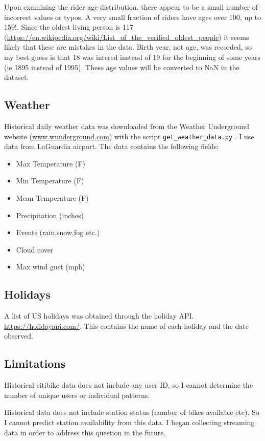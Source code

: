 \documentclass[11pt]{article}
\begin{document}
Upon examining the rider age distribution, there appear to be a small number of incorrect values or typos. A very small fraction of riders have ages over 100, up to 159!. Since the oldest living person is 117 (\url{https://en.wikipedia.org/wiki/List_of_the_verified_oldest_people}) it seems likely that these are mistakes in the data. Birth year, not age, was recorded, so my best guess is that 18 was intered instead of 19 for the beginning of some years (ie 1895 instead of 1995). These age values will be converted to NaN in the dataset.



\subsection{Weather}

Historical daily weather data was downloaded from the Weather Underground website (\url{www.wunderground.com}) with the script \verb+get_weather_data.py+ . I use data from LaGuardia airport. The data contains the following fields:

\begin{itemize}
\item Max Temperature (F)
\item Min Temperature (F)
\item Mean Temperature (F)
\item Precipitation (inches)
\item Events (rain,snow,fog etc.)
\item Cloud cover
\item Max wind gust (mph)
\end{itemize}


\subsection{Holidays}

A list of US holidays was obtained through the holiday API. \url{https://holidayapi.com/}. This contains the name of each holiday and the date observed.


\subsection{Limitations}

Historical citibike data does not include any user ID, so I cannot determine the number of unique users or individual patterns.

Historical data does not include station status (number of bikes available etc). So I cannot predict station availability from this data. I began collecting streaming data in order to address this question in the future.
\end{document}
